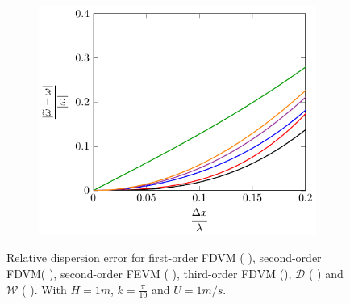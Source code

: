 \begin{figure}
	\begin{subfigure}{0.5\textwidth}
		\includegraphics[width=\textwidth]{./chp4/figures/Dispu1khShallz.pdf}
	\end{subfigure}
	\caption{Relative dispersion error for first-order FDVM ({\color{green!60!black} \solidrule}), second-order FDVM({\color{red} \solidrule}), second-order FEVM ({\color{blue} \solidrule}), third-order FDVM ({\solidrule}), $\mathcal{D}$ ({\color{violet!80!white} \solidrule}) and $\mathcal{W}$ ({\color{orange} \solidrule}). With $H = 1m$, $k = \frac{\pi}{10}$ and $U = 1 m/s$.}
	\label{fig:Dispu1Shall}
\end{figure}

